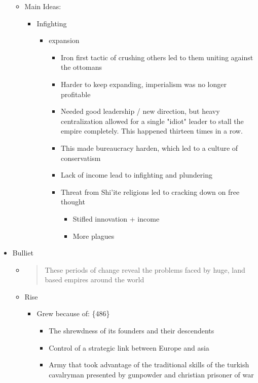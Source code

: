 \documentclass[letterpaper]{article}
\begin{document}
\begin{itemize}
\begin{itemize}
\item Main Ideas:

\begin{itemize}
\item Infighting

\begin{itemize}
\item expansion

\begin{itemize}
\item Iron first tactic of crushing others led to them uniting
against the ottomans
\item Harder to keep expanding, imperialism was no longer profitable
\item Needed good leadership / new direction, but heavy
centralization allowed for a single "idiot" leader to stall
the empire completely. This happened thirteen times in a row.
\item This made bureaucracy harden, which led to a culture of
conservatism
\item Lack of income lead to infighting and plundering
\item Threat from Shi'ite religions led to cracking down on free
thought

\begin{itemize}
\item Stifled innovation + income\\
\item More plagues
\end{itemize}
\end{itemize}
\end{itemize}
\end{itemize}
\end{itemize}

\item Bulliet

\begin{itemize}
\item \begin{quote}
These periods of change reveal the problems faced by huge, land
based empires around the world
\end{quote}

\item Rise

\begin{itemize}
\item Grew because of: \{486\}

\begin{itemize}
\item The shrewdness of its founders and their descendents
\item Control of a strategic link between Europe and asia
\item Army that took advantage of the traditional skills of the
turkish cavalryman presented by gunpowder and christian prisoner
of war
\end{itemize}


\end{itemize}
\end{itemize}
\end{itemize}
\end{document}
